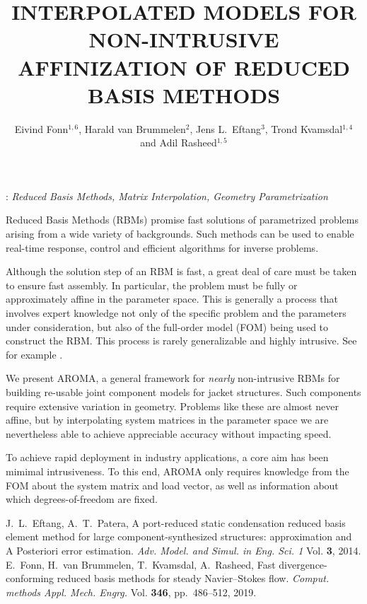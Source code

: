 \documentclass[12pt]{eccomas-2022-_abstract}
\title{INTERPOLATED MODELS FOR NON-INTRUSIVE AFFINIZATION OF REDUCED BASIS METHODS}
\author{Eivind Fonn$^{1,6}$, Harald van Brummelen$^{2}$, Jens L.~Eftang$^{3}$, Trond Kvamsdal$^{1,4}$ and Adil Rasheed$^{1,5}$}
\begin{document}
: {\it Reduced Basis Methods, Matrix Interpolation, Geometry Parametrization}
\vskip0.5cm

Reduced Basis Methods (RBMs) promise fast solutions of parametrized problems
arising from a wide variety of backgrounds. Such methods can be used to enable
real-time response, control and efficient algorithms for inverse problems.

Although the solution step of an RBM is fast, a great deal of care must be taken
to ensure fast assembly. In particular, the problem must be fully or
approximately affine in the parameter space. This is generally a process that
involves expert knowledge not only of the specific problem and the parameters
under consideration, but also of the full-order model (FOM) being used to
construct the RBM.  This process is rarely generalizable and highly intrusive.
See for example \cite{Fonn}.

We present AROMA, a general framework for \emph{nearly} non-intrusive RBMs for
building re-usable joint component models \cite{Eftang} for jacket structures. Such
components require extensive variation in geometry. Problems like these are
almost never affine, but by interpolating system matrices in the parameter
space we are nevertheless able to achieve appreciable accuracy without
impacting speed.

To achieve rapid deployment in industry applications, a core aim has been
mimimal intrusiveness. To this end, AROMA only requires knowledge from the FOM
about the system matrix and load vector, as well as information about which
degrees-of-freedom are fixed.

\begin{thebibliography}{99}
 J.~L.~Eftang, A.~T.~Patera,
A port-reduced static condensation reduced basis element method for large component-synthesized structures: approximation and A Posteriori error estimation.
\textit{Adv. Model. and Simul. in Eng. Sci. 1}
Vol. \textbf{3}, 2014.
 E.~Fonn, H.~van Brummelen, T.~Kvamsdal, A.~Rasheed,
Fast divergence-conforming reduced basis methods for steady Navier–Stokes flow.
\textit{Comput. methods Appl. Mech. Engrg.}
Vol. \textbf{346}, pp.~486--512, 2019.
\end{thebibliography}
\end{document}
